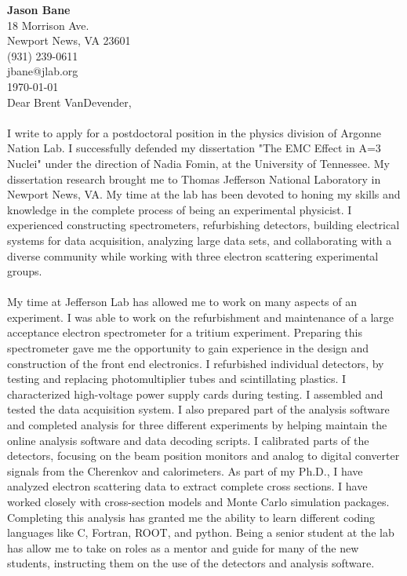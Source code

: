 \documentclass[12pt,letterpaper]{article}
\newcommand{\CPP}
{C\nolinebreak[4]\hspace{-.05em}\raisebox{.22ex}{\footnotesize\bf ++}}
\begin{document}
\vspace*{-1.2cm}
\noindent\textbf{Jason Bane}\\
18 Morrison Ave. \\
Newport News, VA 23601 \\
(931) 239-0611 \\
jbane@jlab.org \\
\today\\

Dear Brent VanDevender,
 
\paragraph{}I write to apply for a postdoctoral position in the physics division of Argonne Nation Lab. I successfully defended my dissertation "The EMC Effect in A=3 Nuclei" under the direction of Nadia Fomin, at the University of Tennessee. My dissertation research brought me to Thomas Jefferson National Laboratory in Newport News, VA. My time at the lab has been devoted to honing my skills and knowledge in the complete process of being an experimental physicist. I experienced constructing spectrometers, refurbishing detectors, building electrical systems for data acquisition, analyzing large data sets, and collaborating with a diverse community while working with three electron scattering experimental groups.
\paragraph{}My time at Jefferson Lab has allowed me to work on many aspects of an experiment. I was able to work on the refurbishment and maintenance of a large acceptance electron spectrometer for a tritium experiment. Preparing this spectrometer gave me the opportunity to gain experience in the design and construction of the front end electronics. I refurbished individual detectors, by testing and replacing photomultiplier tubes and scintillating plastics. I characterized high-voltage power supply cards during testing. I assembled and tested the data acquisition system. I also prepared part of the analysis software and completed analysis for three different experiments by helping maintain the online analysis software and data decoding scripts. I calibrated parts of the detectors, focusing on the beam position monitors and analog to digital converter signals from the Cherenkov and calorimeters. As part of my Ph.D., I have analyzed electron scattering data to extract complete cross sections. I have worked closely with cross-section models and Monte Carlo simulation packages. Completing this analysis has granted me the ability to learn different coding languages like \CPP, Fortran, ROOT, and python. Being a senior student at the lab has allow me to take on roles as a mentor and guide for many of the new students, instructing them on the use of the detectors and analysis software.
\end{document}
